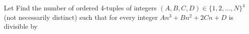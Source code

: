 Let   Find the number of ordered 4-tuples of integers $(A,B,C,D)\in\{1,2,\ldots,N\}^4$ (not necessarily distinct) such that for every integer  $An^3+Bn^2+2Cn+D$ is divisible by 
